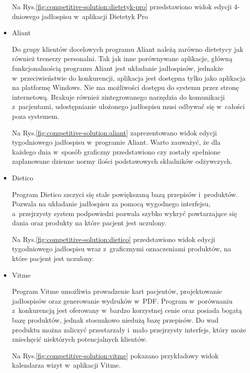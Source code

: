 \begin{itemize}
        Na Rys.\ref{fig:competitive-solution:dietetyk-pro} przedstawiono widok edycji 4-dniowego jadłospisu w~aplikacji Dietetyk Pro

    \item Aliant\cite{url:aliant}

        Do grupy klientów docelowych programu Aliant należą zarówno dietetycy jak również trenerzy personalni.
        Tak jak inne porównywane aplikacje, główną funkcjonalnością programu Aliant jest układanie jadłospisów,
        jednakże w~przeciwieństwie do konkurencji, aplikacja jest dostępna tylko jako aplikacja na platformę Windows.
        Nie ma możliwości dostępu do systemu przez stronę internetową.
        Brakuje również zintegrowanego narzędzia do komunikacji z~pacjentami, udostępnianie ułożonego jadłospisu musi odbywać się w~całości poza systemem.

        Na Rys.\ref{fig:competitive-solution:aliant} zaprezentowano widok edycji tygodniowego jadłospisu w~programie Aliant.
        Warto zauważyć, że dla każdego dnia w~sposób graficzny przedstawiono czy zostały spełnione zaplanowane dzienne normy ilości podstawowych składników odżywczych.

    \item Dietico\cite{url:dietico}

        Program Dietico szczyci się stale powiększaną bazą przepisów i~produktów.
        Pozwala na układanie jadłospisu za pomocą wygodnego interfejsu, a~przejrzysty system podpowiedzi pozwala szybko wykryć powtarzające się dania oraz produkty na które pacjent jest uczulony.

        Na Rys.\ref{fig:competitive-solution:dietico} przedstawiono widok edycji tygodniowego jadłospisu wraz z~graficznymi oznaczeniami produktów, na które pacjent jest uczulony.

    \item Vitme\cite{url:vitme}

        Program Vitme umożliwia prowadzenie kart pacjentów, projektowanie jadłospisów oraz generowanie wydruków w~PDF.
        Program w~porównaniu z~konkurencją jest oferowany w~bardzo korzystnej cenie oraz posiada bogatą bazę produktów, jednak stosunkowo niedużą bazę przepisów.
        Do wad produktu można zaliczyć przestarzały i~mało przejrzysty interfejs, który może zniechęcić niektórych potencjalnych klientów.

        Na Rys.\ref{fig:competitive-solution:vitme} pokazano przykładowy widok kalendarza wizyt w~aplikacji Vitme.

\end{itemize}

